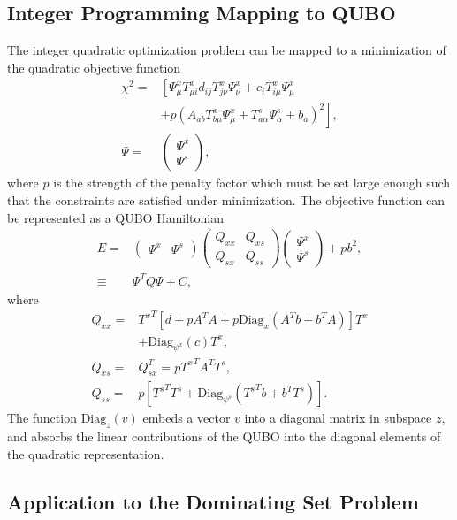 \documentclass[prd,twocolumn,tightenlines,preprintnumbers,showpacs,superscriptaddress,notitlepage,nofootinbib,eqsecnum,
floatfix,longbibliography,aps,10pt]{revtex4-2}
\begin{document}
\subsection{Integer Programming Mapping to QUBO}
\label{sec:results:ilp}
The integer quadratic optimization problem can be mapped to a minimization of the quadratic objective function
\begin{align}
\chi^2 = & \left[\Psi^x_{\mu} T^x_{\mu i}d_{ij} T^x_{j \nu}\Psi^x_\nu + c_i T^x_{i\mu} \Psi^x_\mu \right. \nonumber\\
&\left.+ p (A_{a b} T^x_{b \mu} \Psi^x_{\mu} + T^s_{a \alpha} \Psi^s_\alpha + b_a)^2 \right],\\
\Psi = & \begin{pmatrix}
\Psi^x\\
\Psi^s
\end{pmatrix},
\end{align}
where $p$ is the strength of the penalty factor which must be set large enough such that the constraints are satisfied under minimization. The objective function can be represented as a QUBO Hamiltonian
\begin{align}
E = &
\begin{pmatrix}
\Psi^x & \Psi^s
\end{pmatrix}
\begin{pmatrix}
Q_{xx} & Q_{xs}\\
Q_{sx} & Q_{ss}
\end{pmatrix}
\begin{pmatrix}
\Psi^x\\ \Psi^s
\end{pmatrix} + pb^2,\\
\equiv & \Psi^T Q \Psi + C,
\label{eq:matrix_form}
\end{align}
where
\begin{align}
Q_{xx} = & {T^{x}}^T \left[ d + p A^T A + p \mathrm{Diag}_{x} \left(A^T b + b^T A\right) \right] T^x \nonumber \\
&+ \mathrm{Diag}_{\psi^x}(c) T^x,\\
Q_{xs} = & Q_{sx}^T = p {T^{x}}^T A^T T^s,\\
Q_{ss} = & p\left[ {T^{s}}^T T^s + \mathrm{Diag}_{\psi^s}\left( {T^{s}}^T b + b^T T^s\right) \right].
\end{align}
The function $\mathrm{Diag}_{z}(v)$ embeds a vector $v$ into a diagonal matrix in subspace $z$, and absorbs the linear contributions of the QUBO into the diagonal elements of the quadratic representation.

\subsection{Application to the Dominating Set Problem}
\label{sec:results:mds}
\end{document}
